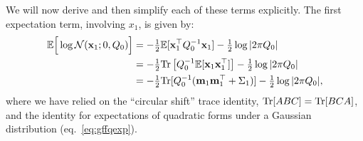 \documentclass[10pt]{article}
\newcommand{\vx}{\mathbf{x}}
\newcommand{\vm}{\mathbf{m}}
\begin{document}
We will now derive and then simplify each
of these terms explicitly.
The first expectation term, involving $x_1$, is given by:
\begin{align}
\E \Big[ \log \Nrm(\vx_{1}; 0, Q_0) \Big]  &= -\tonehlf \E [\vx_1\trp
                                              Q_0\inv \vx_1]  -
                                              \tonehlf \log |2\pi Q_0|
                                              \nonumber \\
                                            &= -\tonehlf \Tr\left[
                                              Q_0\inv \E[\vx_1
                                              \vx_1\trp] \right] 
                                              -  \tonehlf \log |2\pi
                                              Q_0| \nonumber \\ 
  & =  -\tonehlf \Tr [ Q_0\inv (\vm_1 \vm_1\trp+\Sigma_1)] -
    \tonehlf \log |2\pi    Q_0|,
\end{align}
where we have relied on the ``circular shift'' trace identity,
$\mathrm{Tr}[ABC] = \mathrm{Tr}[BCA]$, and the identity for expectations of quadratic
forms under a Gaussian distribution (eq.~\ref{eq:gffqexp}).
\end{document}
